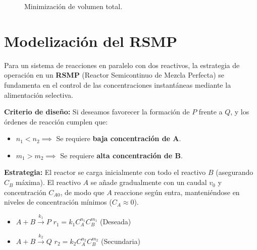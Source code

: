 \begin{figure}
\begin{center}
  \end{center}
  \caption{Minimización de volumen total.}
  \label{fig:minimizacion_volumen}
\end{figure}

\section{Modelización del RSMP}

\noindent Para un sistema de reacciones en paralelo con dos reactivos, la estrategia de operación en un \textbf{RSMP} (Reactor Semicontinuo de Mezcla Perfecta) se fundamenta en el control de las concentraciones instantáneas mediante la alimentación selectiva.

\noindent \textbf{Criterio de diseño:}
Si deseamos favorecer la formación de $P$ frente a $Q$, y los órdenes de reacción cumplen que:
\begin{itemize}
  \item $n_1 < n_2 \implies$ Se requiere \textbf{baja concentración de A}.
  \item $m_1 > m_2 \implies$ Se requiere \textbf{alta concentración de B}.
\end{itemize}

\noindent \textbf{Estrategia:} El reactor se carga inicialmente con todo el reactivo $B$ (asegurando $C_B$ máxima). El reactivo $A$ se añade gradualmente con un caudal $v_0$ y concentración $C_{A0}$, de modo que $A$ reaccione según entra, manteniéndose en niveles de concentración mínimos ($C_A \approx 0$).

\begin{itemize}
  \item $A + B \xrightarrow{k_1} P$ \hspace{1cm} $r_1 = k_1 C_A^{n_1} C_B^{m_1}$ \quad (Deseada)
  \item $A + B \xrightarrow{k_2} Q$ \hspace{1cm} $r_2 = k_2 C_A^{n_2} C_B^{m_2}$ \quad (Secundaria)
\end{itemize}
\newpage
